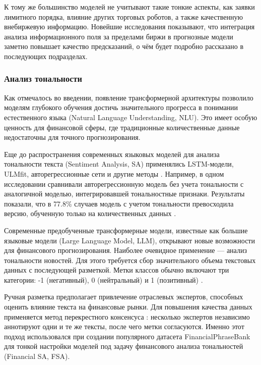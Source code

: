 К тому же большинство моделей не учитывают такие тонкие аспекты, как заявки лимитного порядка, влияние
других торговых роботов, а также качественную внебиржевую информацию. Новейшие исследования показывают,
что интеграция анализа информационного поля за пределами биржи в прогнозные модели заметно повышает качество
предсказаний, о чём будет подробно рассказано в последующих подразделах.

\subsubsection{Анализ тональности}
Как отмечалось во введении, появление трансформерной архитектуры позволило моделям глубокого обучения
достичь значительного прогресса в понимании естественного языка (Natural Language Understanding, NLU).
Это имеет особую ценность для финансовой сферы, где традиционные количественные данные недостаточны
для точного прогнозирования.

Еще до распространения современных языковых моделей для анализа тональности текста (Sentiment Analysis,
SA) применялись LSTM-модели, ULMfit, авторегрессионные сети и другие методы
\parencite{Hochreiter1997LSTM, howard2018ULMFIT}. Например, в одном исследовании сравнивали
авторегрессионную модель без учета тональности с аналогичной моделью, интегрировавшей
тональностные признаки. Результаты показали, что в 77.8\% случаев модель с учетом тональности
превосходила версию, обученную только на количественных данных \parencite{NNAR2019}.

Современные предобученные трансформерные модели, известные как большие языковые модели (Large Language Model,
LLM), открывают новые возможности для финансового прогнозирования. Наиболее очевидное применение ---
анализ тональности новостей. Для этого требуется сбор значительного объема текстовых данных с последующей
разметкой. Метки классов обычно включают три категории: -1 (негативный), 0 (нейтральный) и 1 (позитивный)
\parencite{SA2020taxonomy}.

Ручная разметка предполагает привлечение отраслевых экспертов, способных оценить влияние текста
на финансовые рынки. Для повышения качества данных применяется метод перекрестного консенсуса \parencite{consensus1997bogdan}:
несколько экспертов независимо аннотируют одни и те же тексты, после чего метки согласуются.
Именно этот подход использовался при создании популярного датасета FinancialPhraseBank \parencite{Malo2014FPB} для тонкой
настройки моделей под задачу финансового анализа тональностей (Financial SA, FSA).

